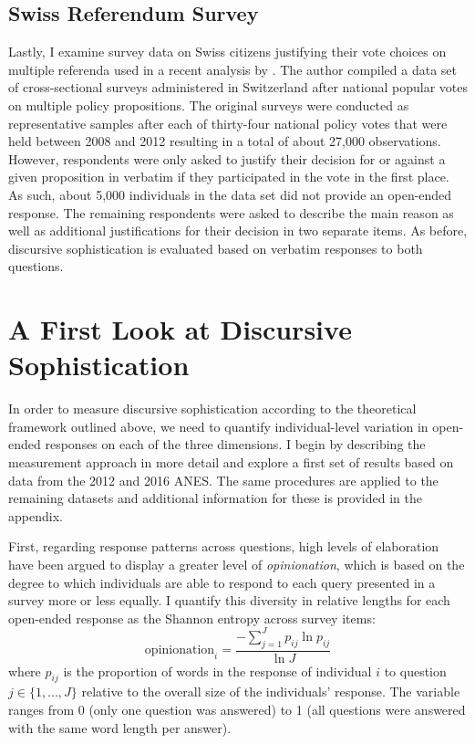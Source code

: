 \subsection*{Swiss Referendum Survey}
Lastly, I examine survey data on Swiss citizens justifying their vote choices on multiple referenda used in a recent analysis by \citet{colombo2016justifications}. The author compiled a data set of cross-sectional surveys administered in Switzerland after national popular votes on multiple policy propositions. The original surveys were conducted as representative samples after each of thirty-four national policy votes that were held between 2008 and 2012 resulting in a total of about 27,000 observations. However, respondents were only asked to justify their decision for or against a given proposition in verbatim if they participated in the vote in the first place. As such, about 5,000 individuals in the data set did not provide an open-ended response. The remaining respondents were asked to describe the main reason as well as additional justifications for their decision in two separate items. As before, discursive sophistication is evaluated based on verbatim responses to both questions.



\section*{A First Look at Discursive Sophistication}

In order to measure discursive sophistication according to the theoretical framework outlined above, we need to quantify individual-level variation in open-ended responses on each of the three dimensions. I begin by describing the measurement approach in more detail and explore a first set of results based on data from the 2012 and 2016 ANES. The same procedures are applied to the remaining datasets and additional information for these is provided in the appendix.

First, regarding response patterns across questions, high levels of elaboration have been argued to display a greater level of \textit{opinionation}, which is based on the degree to which individuals are able to respond to each query presented in a survey more or less equally. I quantify this diversity in relative lengths for each open-ended response as the Shannon entropy across survey items:
\begin{equation}
\text{opinionation}_i = \dfrac{-\sum_{j=1}^J p_{ij} \ln p_{ij}}{\ln J}
\end{equation}
where $p_{ij}$ is the proportion of words in the response of individual $i$ to question $j\in \{1,...,J\}$ relative to the overall size of the individuals' response. The variable ranges from 0 (only one question was answered) to 1 (all questions were answered with the same word length per answer).

